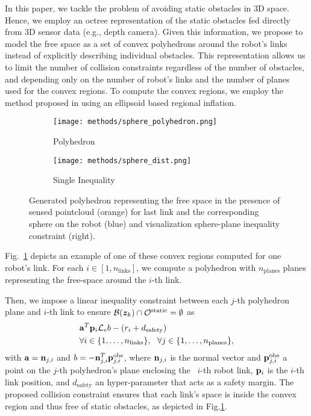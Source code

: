 In this paper, we tackle the problem of avoiding static obstacles in 3D space. Hence, we employ an octree representation of the static obstacles fed directly from 3D sensor data (e.g., depth camera). %
%
Given this information, we propose to model the free space as a set of convex polyhedrons around the robot's links instead of explicitly describing individual obstacles. This representation allows us to limit the number of collision constraints regardless of the number of obstacles, and depending only on the number of robot's links and the number of planes used for the convex regions. To compute the convex regions, we employ the method proposed in \cite{Liu2017} using an ellipsoid based regional inflation.
\begin{figure}[h]
  \centering
  \begin{subfigure}[b]{0.5\linewidth}
    \centering
    \texttt{[image: methods/sphere\_polyhedron.png]}
    \caption{Polyhedron}
  \end{subfigure}
  \begin{subfigure}[b]{0.45\linewidth}
    \centering
    \texttt{[image: methods/sphere\_dist.png]}
    \caption{Single Inequality}
  \end{subfigure}
  \caption{Generated polyhedron representing the free space in the presence of sensed pointcloud (orange) for last link and the corresponding sphere on the robot (blue) and visualization sphere-plane inequality constraint (right).}%
  \label{fig:plane_sphere}
\end{figure}
%
Fig.~\ref{fig:plane_sphere} depicts an example of one of these convex regions computed for one robot's link.
For each $i\in [1,n_{\textrm{links}}]$, we compute a polyhedron with $n_{\textrm{planes}}$ planes representing the free-space around the $i$-th link. 

Then, we impose a linear inequality constraint between each $j$-th polyhedron plane and $i$-th link to ensure $\mathcal{B}(\bm{z}_k) \cap \mathcal{O}^{\textrm{static}} = \emptyset$ as
%
\begin{equation}
    \begin{split} 
        & \mathbf{a}^T \mathbf{p}_i\mathcal{L}_e b - (r_i + d_{\textrm{safety}}) \\ &\forall i \in \{1,\dots,n_{\textrm{links}}\} , \,\,\,\,
        \forall j \in \{1,\dots,n_{\textrm{planes}}\},
    \end{split}
\end{equation}
with $\mathbf{a} = \mathbf{n}_{j,i}$ and $b = -\mathbf{n}_{j,i}^T\mathbf{p}^{\textrm{obs}}_{j,i}$, where $\mathbf{n}_{j,i}$ is the normal vector and $\mathbf{p}^{\textrm{obs}}_{j,i}$ a point on the $j$-th polyhedron's plane enclosing the ~{$i$-th} robot link, $\mathbf{p}_i$ is the $i$-th link position, and $d_{\textrm{safety}}$ an hyper-parameter that acts as a safety margin. The proposed collision constraint ensures that each link's space is inside the convex region and thus free of static obstacles, as depicted in Fig.\ref{fig:plane_sphere}.
%
